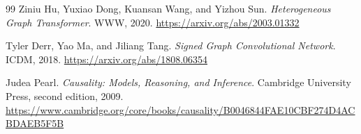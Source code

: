 \documentclass[11pt]{article}
\begin{document}
\begin{thebibliography}{99}
Ziniu Hu, Yuxiao Dong, Kuansan Wang, and Yizhou Sun.
\newblock \emph{Heterogeneous Graph Transformer}.
\newblock WWW, 2020.
\newblock \url{https://arxiv.org/abs/2003.01332}

Tyler Derr, Yao Ma, and Jiliang Tang.
\newblock \emph{Signed Graph Convolutional Network}.
\newblock ICDM, 2018.
\newblock \url{https://arxiv.org/abs/1808.06354}

Judea Pearl.
\newblock \emph{Causality: Models, Reasoning, and Inference}.
\newblock Cambridge University Press, second edition, 2009.
\newblock \url{https://www.cambridge.org/core/books/causality/B0046844FAE10CBF274D4ACBDAEB5F5B}

\end{thebibliography}
\end{document}
